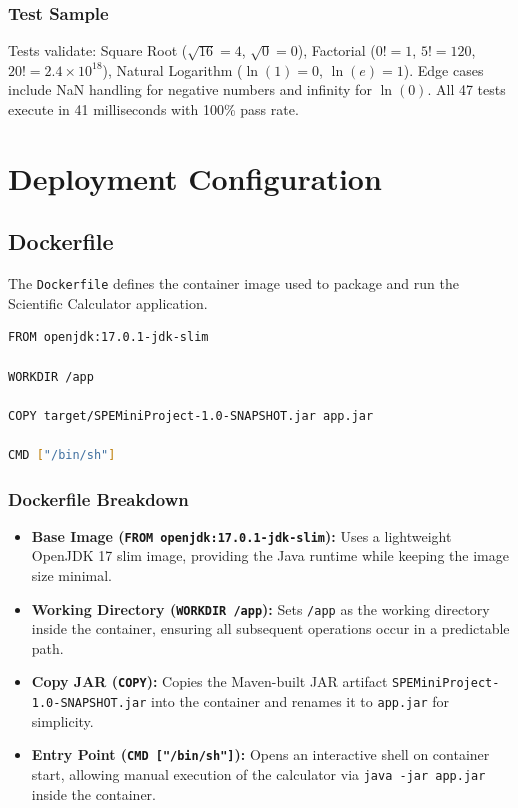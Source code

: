 \documentclass[12pt,a4paper]{article}
\begin{document}
\subsubsection{Test Sample}
Tests validate: Square Root ($\sqrt{16} = 4$, $\sqrt{0} = 0$), Factorial ($0! = 1$, $5! = 120$, $20! = 2.4{\times}10^{18}$), Natural Logarithm ($\ln(1) = 0$, $\ln(e) = 1$). Edge cases include NaN handling for negative numbers and infinity for $\ln(0)$. All 47 tests execute in 41 milliseconds with 100\% pass rate.


\section{Deployment Configuration}

\subsection{Dockerfile}
The \texttt{Dockerfile} defines the container image used to package and run the Scientific Calculator application.

\begin{lstlisting}[language=bash,caption=Dockerfile]
FROM openjdk:17.0.1-jdk-slim

WORKDIR /app

COPY target/SPEMiniProject-1.0-SNAPSHOT.jar app.jar

CMD ["/bin/sh"]
\end{lstlisting}

\subsubsection{Dockerfile Breakdown}
\begin{itemize}
    \item \textbf{Base Image (\texttt{FROM openjdk:17.0.1-jdk-slim}):} Uses a lightweight OpenJDK 17 slim image, providing the Java runtime while keeping the image size minimal.
    \item \textbf{Working Directory (\texttt{WORKDIR /app}):} Sets \texttt{/app} as the working directory inside the container, ensuring all subsequent operations occur in a predictable path.
    \item \textbf{Copy JAR (\texttt{COPY}):} Copies the Maven-built JAR artifact \texttt{SPEMiniProject-1.0-SNAPSHOT.jar} into the container and renames it to \texttt{app.jar} for simplicity.
    \item \textbf{Entry Point (\texttt{CMD ["/bin/sh"]}):} Opens an interactive shell on container start, allowing manual execution of the calculator via \texttt{java -jar app.jar} inside the container.
\end{itemize}
\end{document}
